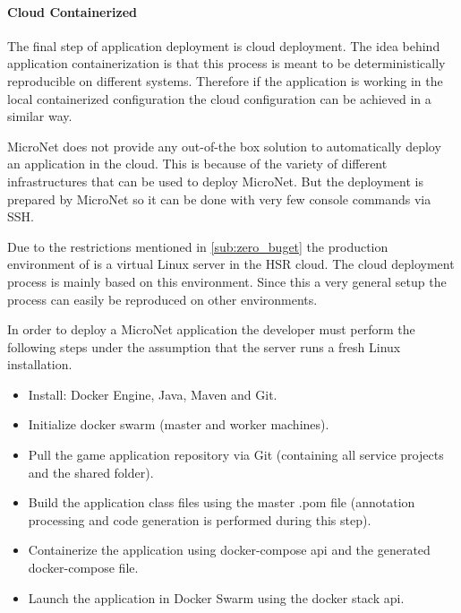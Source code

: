 \paragraph{Cloud Containerized}

The final step of \ms{} application deployment is cloud deployment. The idea
behind application containerization is that this process is meant to be
deterministically reproducible on different systems. Therefore if the
application is working in the local containerized configuration the cloud
configuration can be achieved in a similar way.

MicroNet does not provide any out-of-the box solution to automatically deploy an
application in the cloud. This is because of the variety of
different infrastructures that can be used to deploy MicroNet. But the
deployment is prepared by MicroNet so it can be done with very few console
commands via SSH.

Due to the restrictions mentioned in \autoref{sub:zero_buget} the production
environment of \mn{} is a virtual Linux server in the HSR cloud. The cloud
deployment process is mainly based on this environment. Since this a very
general setup the process can easily be reproduced on other environments.

In order to deploy a MicroNet \ms{} application the developer must perform the
following steps under the assumption that the server runs a fresh Linux
installation.

\begin{itemize}
  \item Install: Docker Engine, Java, Maven and Git.
  \item Initialize docker swarm (master and worker machines).
  \item Pull the game application repository via Git (containing all service
  projects and the shared folder).
  \item Build the application class files using the master .pom file (annotation
  processing and code generation is performed during this step).
  \item Containerize the application using docker-compose \gls{api} and the generated
  docker-compose file.
  \item Launch the application in Docker Swarm using the docker stack \gls{api}.
\end{itemize}

